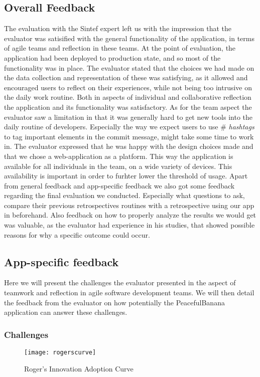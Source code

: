\subsection{Overall Feedback}
The evaluation with the Sintef expert left us with the impression that the evaluator was satisified with the general functionality of the application, in terms of agile teams and reflection in these teams. 
At the point of evaluation, the application had been deployed to production state, and so most of the functionality was in place. The evaluator stated that the choices we had made on the data collection and representation of these was satisfying, as it allowed and encouraged users to reflect on their experiences, while not being too intrusive on the daily work routine. Both in aspects of individual and collaborative reflection the application and its functionality was satisfactory. As for the team aspect the evaluator saw a limitation in that it was generally hard to get new tools into the daily routine of developers. Especially the way we expect users to use \# \emph{hashtags} to tag important elements in the commit message, might take some time to work in. The evaluator expressed that he was happy with the design choices made and that we chose a web-application as a platform. This way the application is available for all individuals in the team, on a wide variety of devices. This availability is important in order to furhter lower the threshold of usage. Apart from general feedback and app-specific feedback we also got some feedback regarding the final evaluation we conducted. Especially what questions to ask, compare their previous retrospectives routines with a retrospective using our app in beforehand. Also feedback on how to properly analyze the results we would get was valuable, as the evaluator had experience in his studies, that showed possible reasons for why a specific outcome could occur. 

\subsection{App-specific feedback}
Here we will present the challenges the evaluator presented in the aspect of teamwork and reflection in agile software development teams. We will then detail the feedback from the evaluator on how potentially the PeacefulBanana application can answer these challenges. 
\subsubsection{Challenges}
\begin{figure}[h!]
    \centering
        \texttt{[image: rogerscurve]}
    \caption{Roger's Innovation Adoption Curve}
    \label{rogerscurve}
\end{figure}


